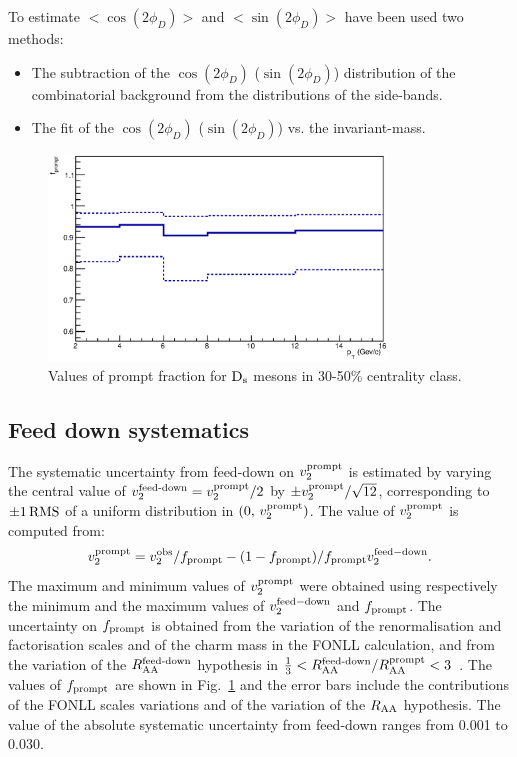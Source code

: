 To estimate $< \cos(2\phi_D) >$ and $< \sin(2\phi_D) >$ 
have been used two methods:
\begin{itemize}
\item The subtraction of the $\cos(2\phi_D)$ ($\sin(2\phi_D)$) 
distribution of the combinatorial background from the distributions of the side-bands.
\item The fit of the $\cos(2\phi_D)$ ($\sin(2\phi_D)$) vs. the invariant-mass.
\end{itemize}
\fi
\begin{figure}
 \centering
 \includegraphics[width=9cm]{FigCap5/fprompt_3050.eps}
\caption{Values of prompt fraction for ${\rm D_s}$ mesons in 30-50\% centrality class.}
\label{fig:fPrompt}
\end{figure}

\subsection{Feed down systematics}
\label{FDsystV2}
The systematic uncertainty from feed-down on $v_{2}^{\rm prompt}$ 
is estimated by varying the central value of 
$v_{2}^{\rm feed\textnormal{-}down}=v_{2}^{\rm prompt}/2$ by $ \pm v_{2}^{\rm prompt}/\sqrt{12}$, corresponding to 
$\rm \pm 1\,RMS$ of a uniform distribution in $(0,\,v_{2}^{\rm prompt})$.
The value of $v_2^{\rm prompt}$ is computed from:
\begin{equation}
v_{2}^{\rm prompt}=v_{2}^{\rm obs}/f_{\rm prompt} - (1-f_{\rm prompt})/f_{\rm prompt}v_{2}^{\rm feed-down}.
\end{equation} 
The maximum and minimum values of $v_2^{\rm prompt}$ were
obtained using respectively the minimum and the maximum values 
of $v_{\rm 2}^{\rm feed-down}$ and $f_{\rm prompt}$. 
The uncertainty on $f_{\rm prompt}$ is obtained from the
variation of the renormalisation and factorisation scales and of the charm
mass in the FONLL calculation, and from the variation of the 
$R_{\rm AA}^{\rm feed\textnormal{-}down}$ hypothesis in  
$\frac{1}{3}< R_{\rm AA}^{\rm feed\textnormal{-}down}/R_{\rm AA}^{\rm prompt}<3$~\cite{Adam:2015jda}. The values of $f_{\rm prompt}$ 
are shown in Fig.~\ref{fig:fPrompt} and the error bars include the
contributions of the FONLL scales variations and of the variation of
the $R_{\rm AA}$ hypothesis. The value of the absolute systematic uncertainty from feed-down ranges from 0.001 to 0.030.

